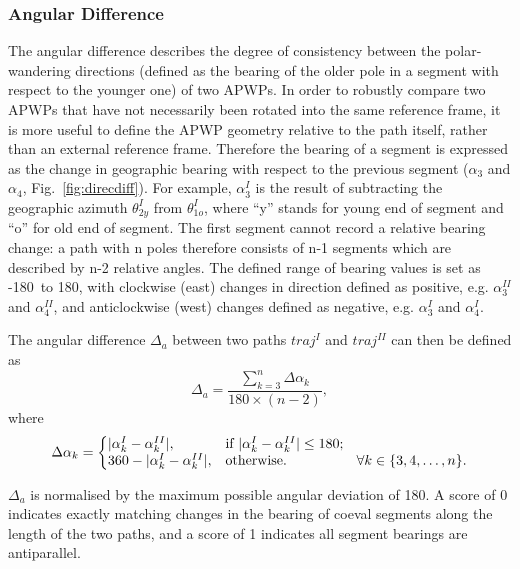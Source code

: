 \subsubsection{Angular Difference}

The angular difference describes the degree of consistency between the
polar-wandering directions (defined as the bearing of the older pole in a
segment with respect to the younger one) of two APWPs. In order to robustly
compare two APWPs that have not necessarily been rotated into the same reference
frame, it is more useful to define the APWP geometry relative to the path
itself, rather than an external reference frame. Therefore the bearing of a
segment is expressed as the change in geographic bearing with respect to the
previous segment ($\alpha_3$ and $\alpha_4$, Fig.~\ref{fig:direcdiff}). For
example, $\alpha_3^I$ is the result of subtracting the geographic azimuth
$\theta_{2y}^I$ from $\theta_{1o}^I$, where ``y'' stands for young end of
segment and ``o'' for old end of segment. The first segment cannot record a
relative bearing change: a path with n poles therefore consists of n-1 segments
which are described by n-2 relative angles. The defined range of bearing values
is set as -180\degree\ to 180\degree, with clockwise (east) changes in direction
defined as positive, e.g. {\bf $\alpha_3^{II}$} and {\bf $\alpha_4^{II}$}, and
anticlockwise (west) changes defined as negative, e.g. {\bf $\alpha_3^I$} and
{\bf $\alpha_4^I$}.

The angular difference $\Delta_a$ between two paths $traj^I$ and $traj^{II}$ can
then be defined as
%
\begin{equation*}
  \Delta_a = \frac{\sum\limits_{k=3}^n \Delta\alpha_k}{180\times(n-2)},
\label{eq:ad}
\end{equation*}
%
where
%
\begin{equation*}
\Delta\alpha_k =
\left\{
\begin{array}{@{}ll@{}}
| \alpha_k^I - \alpha_k^{II} |, & \text{if}\ | \alpha_k^I -
\alpha_k^{II} | \leq180; \\
360 - | \alpha_k^I - \alpha_k^{II} |, &
  \text{otherwise}.\quad\quad\quad\quad\quad\forall k \in \{3,4,\ldots,n\}.
\end{array}
\right.\label{eq:diffAziChange}
\end{equation*}

$\Delta_a$ is normalised by the maximum possible angular deviation of
180\degree. A score of 0 indicates exactly matching changes in the bearing of
coeval segments along the length of the two paths, and a score of 1 indicates
all segment bearings are antiparallel.

